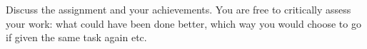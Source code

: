Discuss the assignment and your achievements.
You are free to critically assess your work:
what could have been done better, which way you would choose to go if given the same task again etc.